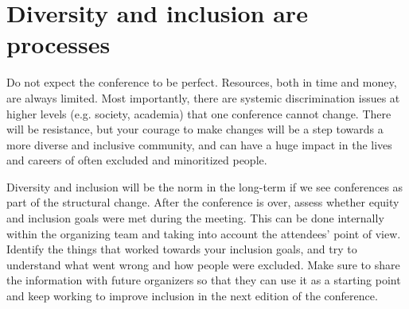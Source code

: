 \documentclass[10pt,letterpaper]{article}
\begin{document}
\section{Diversity and inclusion are processes}
\label{rule_process}

Do not expect the conference to be perfect. 
Resources, both in time and money, are always limited. 
Most importantly, there are systemic discrimination issues at higher levels (e.g. society, academia) that one conference cannot change. 
There will be resistance, but your courage to make changes will be a step towards a more diverse and inclusive community, and can have a huge impact in the lives and careers of often excluded and minoritized people.

Diversity and inclusion will be the norm in the long-term if we see conferences as part of the structural change. 
After the conference is over, assess whether equity and inclusion goals were met during the meeting. 
This can be done internally within the organizing team and taking into account the attendees' point of view. 
Identify the things that worked towards your inclusion goals, and try to understand what went wrong and how people were excluded.
Make sure to share the information with future organizers so that they can use it as a starting point and keep working to improve inclusion in the next edition of the conference. 

\end{document}
